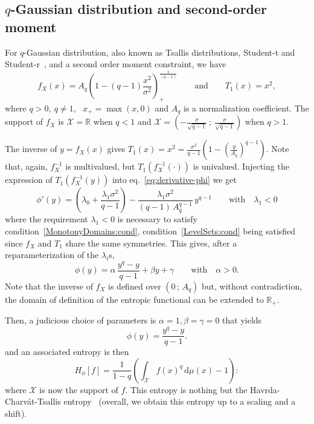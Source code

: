 \documentclass[entropy,article,submit,moreauthors,pdftex]{Definitions/mdpi}
\def\dmu{\mathrm{d}\mu}%
\def\Rset{\mathbb{R}}%
\def\X{\mathcal{X}}%
\begin{document}
\subsection{$q$-Gaussian distribution and second-order moment}
\label{subsecapp:qNormalSecondOrder}

For $q$-Gaussian  distribution, also  known as Tsallis  distributions, Student-t
and   Student-r~\cite{CosHer03,  JohKot95:v2},   and  a   second  order   moment
constraint, we have
%
\[
f_X(x)     =    A_q     \left(     1     -    (q-1)     \frac{x^2}{\sigma^2}
\right)_{\!+}^{\frac{1}{(q-1)}} \qquad \mbox{and} \qquad T_1(x) = x^2,
\]
%
where $q  > 0, \:  q \ne 1$,  \ $x_+ = \max(x,0)$  and $A_q$ is  a normalization
coefficient.   The  support  of  $f_X$  is  $\X  =  \Rset$  when  $q  <  1$  and
$\displaystyle   \X    =   \left(   -   \frac{\sigma}{\sqrt{q-1}}    \:   ;   \:
\frac{\sigma}{\sqrt{q-1}} \right)$ when $q > 1$.

The inverse of $y = f_X(x)$ gives  $T_1(x) = x^2 = \frac{\sigma^2}{q-1} \left( 1
- \left( \frac{y}{A_q} \right)^{q-1} \right)$.   Note that, again, $f_X^{-1}$ is
multivalued, but $T_1\left( f_X^{-1}( \cdot  ) \right)$ is univalued.  Injecting
the     expression      of     $T_1\left(     f_X^{-1}(y)      \right)$     into
eq.~\eqref{eq:derivative-phi} we get
%
\[
\phi'(y)  =   \left(  \lambda_0  +  \frac{\lambda_1   \sigma^2}{q-1}  \right)  -
\frac{\lambda_1  \sigma^2}{(q-1) \,  A_q^{q-1}}  \,  y^{q-1} \qquad  \mbox{with}
\quad \lambda_1 < 0
\]
%
where   the   requirement   $\lambda_1   <    0$   is   necessary   to   satisfy
condition~\ref{MonotonyDomains:cond},    condition~\ref{LevelSets:cond}    being
satisfied since $f_X$ and $T_1$ share  the same symmetries.  This gives, after a
reparameterization of the $\lambda_i$s,
%
\[
\phi(y) = \alpha  \, \frac{y^q - y}{q-1}  + \beta y +  \gamma \qquad \mbox{with}
\quad \alpha > 0.
\]
%
Note that the  inverse of $f_X$ is defined  over $\left( 0 \, ;  \, A_q \right)$
but, without contradiction, the domain  of definition of the entropic functional
can be extended to $\Rset_+$.

Then, a judicious choice of parameters is $\alpha  = 1, \beta = \gamma = 0$ that
yields
%
\[
\phi(y) = \frac{y^q-y}{q-1}.
\]
%
and an associated entropy is then 
%
\[
H_\phi[f] = \frac{1}{1-q} \left( \int_\X f(x)^q \, \dmu(x) - 1 \right):
\]
%
where  $\X$  is  now the  support  of  $f$.  This  entropy is  nothing  but  the
Havrda-Charv\'at-Tsallis   entropy~\cite{HavCha67,   Dar70,   Tsa88,   CosHer03}
(overall, we obtain this entropy up to a scaling and a shift).
\end{document}
